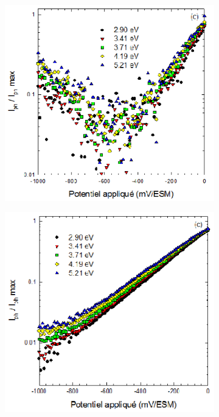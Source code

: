     \renewcommand{\coef}{0.45}
    \begin{figure}[h]
        \centering
        \begin{subfigure}{\coef\textwidth}
            \centering
            \includegraphics[width=\textwidth]{./src/figures/Loucif2012-Fig3-18.png}
            \caption{}
            \label{fig:loucif_sctype_a}
        \end{subfigure}
        \begin{subfigure}{\coef\textwidth}
            \centering
            \includegraphics[width=\textwidth]{./src/figures/Loucif2012-Fig3-19.png}
            \caption{}
            \label{fig:loucif_sctype_b}
        \end{subfigure}
        

\end{figure}
